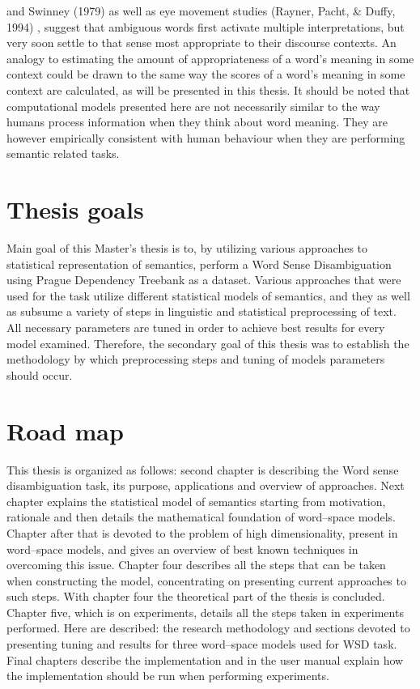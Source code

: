  and Swinney (1979)
as well as eye movement studies (Rayner, Pacht, \& Duffy, 1994)
, suggest that ambiguous words first activate multiple interpretations, but very soon settle to that sense most appropriate to their discourse contexts. An analogy to estimating the amount of appropriateness of a word's meaning in some context could be drawn to the same way the scores of a word's meaning in some context are calculated, as will be presented in this thesis. It should  be noted that computational models presented here are not necessarily similar to the way humans process information when they think about word meaning. They are however empirically consistent with human behaviour when they are performing semantic related tasks. 

\section{Thesis goals}   
Main goal of this Master's thesis is to, by utilizing various approaches to statistical representation of 
semantics, perform a Word Sense Disambiguation using Prague Dependency Treebank as a dataset. 
Various approaches that were used for the task utilize different statistical models of semantics, and they as well as subsume a variety of steps in linguistic and statistical preprocessing of text. All necessary parameters
are tuned in order to achieve best results for every model examined. Therefore, the secondary goal of this thesis was to establish the methodology by which preprocessing steps and tuning of models parameters should occur. 

\section{Road map}
This thesis is organized as follows: second chapter is describing the Word sense disambiguation task, its 
purpose, applications and overview of approaches. Next chapter explains the statistical model of 
 semantics starting from motivation, rationale and then details the mathematical foundation of 
word--space models. Chapter after that is devoted to the problem of high dimensionality, present in
word--space models, and gives an overview of best known techniques in overcoming this issue. Chapter
four describes all the steps that can be taken when constructing the model, concentrating on presenting current approaches to such steps. With chapter four the theoretical part of the thesis is concluded. Chapter five, which is on experiments, details all the steps taken in experiments performed. Here are described: the research methodology and sections devoted to presenting tuning and results for three word--space models
used for WSD task. Final chapters describe the implementation and in the user manual explain how the 
implementation should be run when performing experiments.


